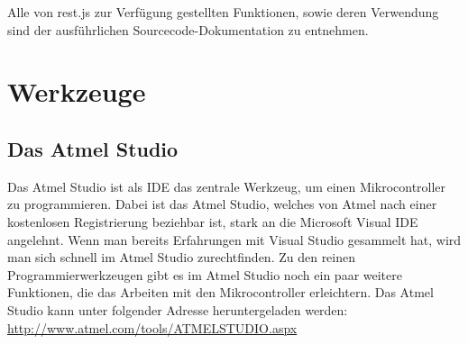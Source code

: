 Alle von \textrm{rest.js} zur Verfügung gestellten Funktionen, sowie deren
Verwendung sind der ausführlichen Sourcecode-Dokumentation zu entnehmen.


\section{Werkzeuge}

\subsection{Das Atmel Studio}

Das Atmel Studio ist als \ac{IDE} das zentrale Werkzeug, um einen Mikrocontroller
zu programmieren. Dabei ist das Atmel Studio, welches von Atmel nach einer
kostenlosen Registrierung beziehbar ist, stark an die Microsoft Visual \ac{IDE}
angelehnt. Wenn man bereits Erfahrungen mit Visual Studio gesammelt hat, wird
man sich schnell im Atmel Studio zurechtfinden. Zu den reinen
Programmierwerkzeugen gibt es im Atmel Studio noch ein paar weitere Funktionen,
die das Arbeiten mit den Mikrocontroller erleichtern.
Das Atmel Studio kann unter folgender Adresse heruntergeladen werden:
\url{http://www.atmel.com/tools/ATMELSTUDIO.aspx}

